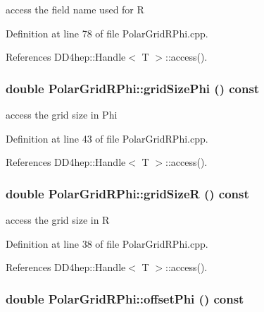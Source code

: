 access the field name used for R 

Definition at line 78 of file PolarGridRPhi.cpp.

References DD4hep::Handle$<$ T $>$::access().\hypertarget{class_d_d4hep_1_1_geometry_1_1_polar_grid_r_phi_a3a83a24366bd66a0ef63d05fd18959fe}{
\subsubsection[{gridSizePhi}]{\setlength{\rightskip}{0pt plus 5cm}double PolarGridRPhi::gridSizePhi () const}}
\label{class_d_d4hep_1_1_geometry_1_1_polar_grid_r_phi_a3a83a24366bd66a0ef63d05fd18959fe}


access the grid size in Phi 

Definition at line 43 of file PolarGridRPhi.cpp.

References DD4hep::Handle$<$ T $>$::access().\hypertarget{class_d_d4hep_1_1_geometry_1_1_polar_grid_r_phi_a2cee7089de4ab9226f8a7f0e81776705}{
\subsubsection[{gridSizeR}]{\setlength{\rightskip}{0pt plus 5cm}double PolarGridRPhi::gridSizeR () const}}
\label{class_d_d4hep_1_1_geometry_1_1_polar_grid_r_phi_a2cee7089de4ab9226f8a7f0e81776705}


access the grid size in R 

Definition at line 38 of file PolarGridRPhi.cpp.

References DD4hep::Handle$<$ T $>$::access().\hypertarget{class_d_d4hep_1_1_geometry_1_1_polar_grid_r_phi_a5f89a64638e40b172652f20cf2a0c958}{
\subsubsection[{offsetPhi}]{\setlength{\rightskip}{0pt plus 5cm}double PolarGridRPhi::offsetPhi () const}}
\label{class_d_d4hep_1_1_geometry_1_1_polar_grid_r_phi_a5f89a64638e40b172652f20cf2a0c958}



